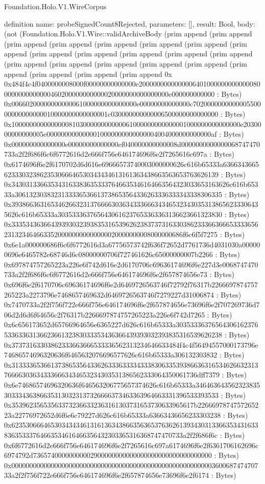 \begin{lexlean}{Foundation.Holo.V1.WireCorpus}
\begin{semanticmodule}
definition{
  name: probeSignedCount8Rejected,
  parameters: [],
  result: Bool,
  body: (not (Foundation.Holo.V1.Wire::validArchiveBody (prim append (prim append (prim append (prim append (prim append (prim append (prim append (prim append (prim append (prim append (prim append (prim append (prim append (prim append (prim append (prim append (prim append (prim append (prim append (prim append (prim append (prim append 0x 0x484f4c4f0400000008000f00000000000000e20000000000000064010000000000000800000000000000460200000000000020000000000000000e000000000000 : Bytes) 0x00660200000000000061000000000000000e00000000000000c702000000000000550000000000000010000000000000001c030000000000006500000000000000 : Bytes) 0x1000000000000000810300000000000061000000000000001000000000000000e2030000000000005e0000000000000010000000000000004004000000000000af : Bytes) 0x000000000000000e00000000000000ef040000000000008d0000000000000068747470733a2f2f686f6c6f6772616d2e666f756e646174696f6e2f7265616c697a : Bytes) 0x6174696f6e2f6170702d6d616e69666573740003000000626c616b65333a6366343665623330323862353066646530343434613161363438663563653763626139 : Bytes) 0x3430313366353431633836353337646635346164663564323033653163626c616b65333a3061323038323133336536613738653564336263336333343338306335 : Bytes) 0x3938663631653462663231376666303634333666343465323430353138656233306435626c616b65333a3035333637656430616237653363363136623661323830 : Bytes) 0x33353436366439393032393835316539626238373731633038623336636665333365623132346466335200000000000000020000000008000000686f6c6f5f7275 : Bytes) 0x6e1a000000686f6c6f6772616d3a67756573742f636f72652d7761736d4031030a000000696e6465782e68746d6c08000000706f727461626c65000000007b2266 : Bytes) 0x697874757265223a226e6f742d616e2d6170706c69636174696f6e227d3e0068747470733a2f2f686f6c6f6772616d2e666f756e646174696f6e2f657874656e73 : Bytes) 0x696f6e2f6170706c69636174696f6e2d6469726563746f72792f76317b2266697874757265223a2273796e7468657469632d6469726563746f7279227d31006874 : Bytes) 0x7470733a2f2f756f722e666f756e646174696f6e2f657874656e73696f6e2f707269736d706d2d6d6f64656c2f76317b2266697874757265223a226e6f742d7265 : Bytes) 0x6c656173652d65766964656e6365227d626c616b65333a303533363765643061623765336336313662366132383033353436366439393032393835316539626238 : Bytes) 0x37373163303862333663666533336562313234646633484f4c4f56494557000173796e74686574696320636f6465632076696577626c616b65333a306132303832 : Bytes) 0x313333653661373865356433626333633334333830633539386636316534626632313766663036343336663434653234303531386562333064350061736dff7379 : Bytes) 0x6e74686574696320636f646563206775657374626c616b65333a346463643562323835303334363866353130323137326666373463363964663331396533393533 : Bytes) 0x353962356535633732366332363161303731653730633965617b2266697874757265223a22776972652d6f6e6c79227d626c616b65333a63663436656233303238 : Bytes) 0x62353066646530343434613161363438663563653763626139343031336635343163383635333764663534616466356432303365316368747470733a2f2f686f6c : Bytes) 0x6f6772616d2e666f756e646174696f6e2f7265616c697a6174696f6e2f6361706162696c6974792d73657400000000002900000000000000000000000000000000 : Bytes) 0x00000000000000000000000000000000000000000000000000000000360068747470733a2f2f756f722e666f756e646174696f6e2f657874656e73696f6e2f6174 : Bytes) }
\end{semanticmodule}
\end{lexlean}
